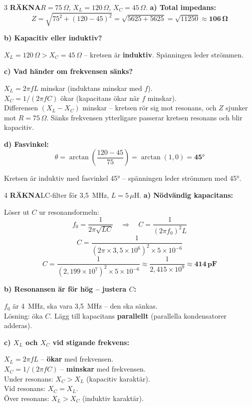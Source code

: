 \documentclass[a4paper,11pt,twoside]{book}
\newcommand{\qrakna}{\colorbox{bluepale}{\textcolor{bluedark}{\headingfont\bfseries\tiny RÄKNA}}}
\begin{document}
\begin{facitblock}{3}
\qrakna\quad $R = 75\,\Omega$, $X_L = 120\,\Omega$, $X_C = 45\,\Omega$.
\tcblower
\textbf{a) Total impedans:}
\[ Z = \sqrt{75^2 + (120 - 45)^2} = \sqrt{5625 + 5625} = \sqrt{11250} \approx \mathbf{106\,\Omega} \]

\textbf{b) Kapacitiv eller induktiv?}

$X_L = 120\,\Omega > X_C = 45\,\Omega$ --
kretsen är \textbf{induktiv}. Spänningen leder strömmen.

\textbf{c) Vad händer om frekvensen sänks?}

$X_L = 2\pi f L$ minskar (induktans minskar med $f$).\\
$X_C = 1/(2\pi f C)$ ökar (kapacitans ökar när $f$ minskar).\\

Differensen $(X_L - X_C)$ minskar -- kretsen rör sig
mot resonans, och $Z$ sjunker mot $R = 75\,\Omega$.
Sänks frekvensen ytterligare passerar kretsen resonans
och blir kapacitiv.

\textbf{d) Fasvinkel:}
\[ \theta = \arctan\!\left(\frac{120 - 45}{75}\right) = \arctan(1{,}0) = \mathbf{45°} \]

Kretsen är induktiv med fasvinkel 45° -- spänningen
leder strömmen med 45°.
\end{facitblock}

\begin{facitblock}{4}
\qrakna\quad LC-filter för 3,5~MHz, $L = 5\,\mu\text{H}$.
\tcblower
\textbf{a) Nödvändig kapacitans:}

Löser ut $C$ ur resonansformeln:
\[ f_0 = \frac{1}{2\pi\sqrt{LC}} \quad\Rightarrow\quad C = \frac{1}{(2\pi f_0)^2 L} \]
\[ C = \frac{1}{(2\pi \times 3{,}5 \times 10^6)^2 \times 5 \times 10^{-6}} \]
\[ C = \frac{1}{(2{,}199 \times 10^7)^2 \times 5 \times 10^{-6}} \approx \frac{1}{2{,}415 \times 10^9} \approx \mathbf{414\,\text{pF}} \]

\textbf{b) Resonansen är för hög -- justera $C$:}

$f_0$ är 4~MHz, ska vara 3,5~MHz -- den ska sänkas.\\
Lösning: öka $C$. Lägg till kapacitans \textbf{parallellt} 
(parallella kondensatorer adderas).

\textbf{c) $X_L$ och $X_C$ vid stigande frekvens:}

$X_L = 2\pi f L$ -- \textbf{ökar} med frekvensen.\\
$X_C = 1/(2\pi f C)$ -- \textbf{minskar} med frekvensen.\\

Under resonans: $X_C > X_L$ (kapacitiv karaktär).\\
Vid resonans: $X_C = X_L$.\\
Över resonans: $X_L > X_C$ (induktiv karaktär).
\end{facitblock}
\end{document}
